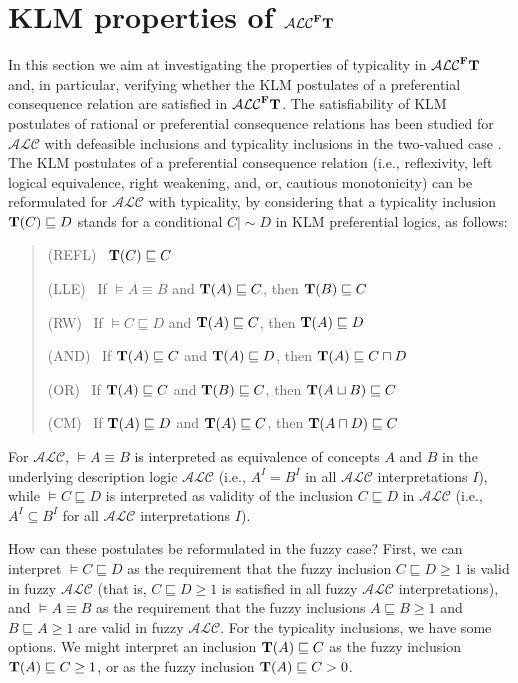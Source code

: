 \documentclass[runningheads]{llncs}
\newcommand {\ent} {\mathrel{{\scriptstyle\mid\!\sim}}}
\newcommand{\tip}{{\bf T}}
\newcommand{\alc}{\mathcal{ALC}}
\newcommand{\alcFt}{\mathcal{ALC}^{\Fe}\tip}
\newcommand {\Fe} {{\bf F}}
\begin{document}
\section{KLM properties of $\alcFt$} %

In this section we aim at investigating the properties of typicality in $\alcFt$ and, in particular, verifying whether  the KLM postulates of a preferential consequence relation \cite{KrausLehmannMagidor:90,whatdoes} are satisfied in $\alcFt$.
The satisfiability of KLM postulates of rational or preferential consequence relations \cite{KrausLehmannMagidor:90,whatdoes} has been studied for $\alc$ with defeasible inclusions and typicality inclusions in the two-valued case \cite{sudafricaniKR,FI09}. The KLM postulates of a preferential consequence relation (i.e., reflexivity, left logical equivalence, right weakening, and, or, cautious monotonicity)
can be reformulated for $\alc$ with typicality, by considering that a typicality inclusion $\tip(C) \sqsubseteq D$ stands for a conditional $C {\ent} D$ in KLM preferential logics, as follows:

\begin{quote}

(REFL) \ $\tip(C) \sqsubseteq C $

(LLE) \ If $\models A \equiv B$ and $\tip(A) \sqsubseteq C $, then $\tip(B) \sqsubseteq C $ 

(RW) \  If $\models C \sqsubseteq D$ and $\tip(A) \sqsubseteq C $, then $\tip(A) \sqsubseteq D $ 

(AND) \ If $\tip(A) \sqsubseteq C $ and $\tip(A) \sqsubseteq D $, then $\tip(A) \sqsubseteq C \sqcap D $ 

(OR) \ If $\tip(A) \sqsubseteq C $ and $\tip(B) \sqsubseteq C $, then $\tip(A \sqcup B) \sqsubseteq C $

(CM) \  If $\tip(A) \sqsubseteq D$ and $\tip(A) \sqsubseteq C $, then $\tip(A \sqcap D) \sqsubseteq C $

\end{quote}
For $\alc$, $\models A \equiv B$ is interpreted as equivalence of concepts $A$ and $B$ in the underlying description logic $\alc$ (i.e., $A^I = B^I$ in all $\alc$ interpretations $I$), while $\models C \sqsubseteq D$
is interpreted as validity of the inclusion $C \sqsubseteq D$ in $\alc$ (i.e.,  $A^I \subseteq B^I$ for all $\alc$ interpretations $I$).


How can these postulates be reformulated in the fuzzy case? First, we can interpret $\models C \sqsubseteq D$ as the requirement that the fuzzy inclusion $C \sqsubseteq D \geq 1$ is valid in fuzzy $\alc$ (that is, $C \sqsubseteq D \geq 1$ is satisfied in all fuzzy $\alc$ interpretations),
and $\models A\equiv B$ as the requirement that the fuzzy inclusions $A \sqsubseteq B \geq 1$ and $B \sqsubseteq A \geq 1$ are valid in fuzzy $\alc$.
For the typicality inclusions, we have some options. We might interpret an inclusion $\tip(A) \sqsubseteq C $ as the fuzzy inclusion $\tip(A) \sqsubseteq C \geq 1$, or as the fuzzy inclusion $\tip(A) \sqsubseteq C > 0$.
\end{document}
